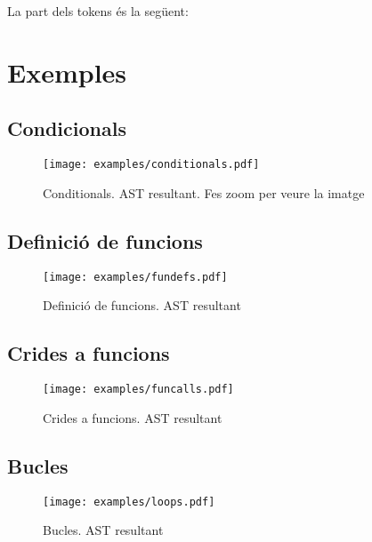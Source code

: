 \documentclass[a4paper,11pt]{article}
\begin{document}


\noindent La part dels tokens és la següent:



\clearpage

\section{Exemples}
\subsection{Condicionals}

\begin{figure}[h!]
  \texttt{[image: examples/conditionals.pdf]}
  \caption{Conditionals. AST resultant. Fes zoom per veure la imatge}
\end{figure}

\clearpage

\subsection{Definició de funcions}

\begin{figure}[h!]
  \texttt{[image: examples/fundefs.pdf]}
  \caption{Definició de funcions. AST resultant}
\end{figure}

\clearpage

\subsection{Crides a funcions}

\begin{figure}[h!]
  \texttt{[image: examples/funcalls.pdf]}
  \caption{Crides a funcions. AST resultant}
\end{figure}

\clearpage

\subsection{Bucles}

\begin{figure}[h!]
  \texttt{[image: examples/loops.pdf]}
  \caption{Bucles. AST resultant}
\end{figure}
\end{document}
